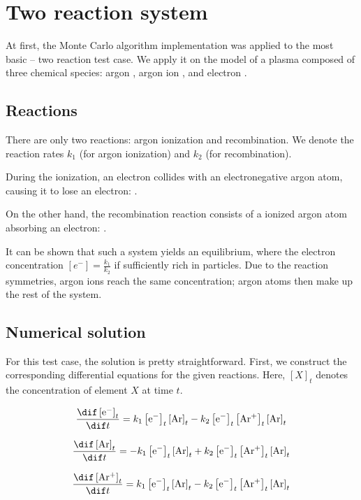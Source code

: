 \chapter{Two reaction system}

At first, the Monte Carlo algorithm implementation was applied to the most basic -- two reaction test case. We apply it on the model of a plasma composed of three chemical species: argon ,  argon ion , and electron .

\section{Reactions}

There are only two reactions: argon ionization and recombination. We denote the reaction rates $k_1$ (for argon ionization) and $k_2$ (for recombination).

During the ionization, an electron collides with an electronegative argon atom, causing it to lose an electron:
.

On the other hand, the recombination reaction consists of a ionized argon atom absorbing an electron: 
.

It can be shown that such a system yields an equilibrium, where the electron concentration $\left[ e^{-} \right] = \frac{k_1}{k_2}$ if sufficiently rich in particles. Due to the reaction symmetries, argon ions reach the same concentration; argon atoms then make up the rest of the system.

\section{Numerical solution}

For this test case, the solution is pretty straightforward. First, we construct the corresponding differential equations for the given reactions. Here, $\left[ X\right]_t$ denotes the concentration of element $X$ at time $t$. 

$$ \frac{\dif \left[ \rm e^{-} \right]_t}{\dif t} = k_1\left[ \rm e^{-}\right]_t \left[ \rm Ar\right]_t - k_2 \left[ \rm e^{-}\right]_t \left[ \rm Ar^{+}\right]_t \left[ \rm Ar\right]_t$$

$$\frac{\dif \left[\rm Ar\right]_t}{\dif t} = - k_1\left[ \rm e^{-}\right]_t \left[ \rm Ar\right]_t + k_2 \left[ \rm e^{-}\right]_t \left[ \rm Ar^{+}\right]_t \left[ \rm Ar\right]_t$$

$$\frac{\dif \left[\rm Ar^{+}\right]_t}{\dif t} = k_1\left[ \rm e^{-}\right]_t \left[ \rm Ar\right]_t - k_2 \left[ \rm e^{-}\right]_t \left[ \rm Ar^{+}\right]_t \left[ \rm Ar\right]_t$$

